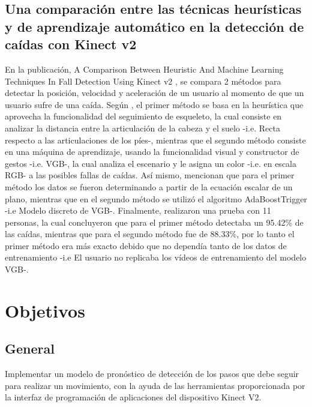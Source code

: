 \documentclass[twoside,twocolumn]{article}
\begin{document}
\subsection{Una comparaci\'on entre las t\'ecnicas heur\'isticas y de aprendizaje autom\'atico en la detecci\'on de ca\'idas con Kinect v2} \label{tr:7}
En la publicaci\'on, A Comparison Between Heuristic And Machine Learning Techniques In Fall Detection Using Kinect v2 \cite{amini2016comparison}, se compara 2 m\'etodos para detectar la posici\'on, velocidad y aceleraci\'on de un usuario al momento de que un usuario sufre de una ca\'ida.
\medbreak 
Seg\'un , el primer m\'etodo se basa en la heur\'istica que aprovecha la funcionalidad del seguimiento de esqueleto, la cual consiste en analizar la distancia entre la articulaci\'on de la cabeza y el suelo -i.e. Recta respecto a las articulaciones de los p\'ies-, mientras que el segundo m\'etodo consiste en una m\'aquina de aprendizaje, usando la funcionalidad visual y constructor de gestos -i.e. VGB-, la cual analiza el escenario y le asigna un color -i.e. en escala RGB- a las posibles fallas de ca\'idas.
\medbreak 
As\'i mismo,  mencionan que para el primer m\'etodo los datos se fueron determinando a partir de la ecuaci\'on escalar de un plano, mientras que en el segundo m\'etodo se utiliz\'o el algoritmo AdaBoostTrigger -i.e Modelo discreto de VGB-.
\medbreak 
Finalmente,  realizaron una prueba con 11 personas, la cual concluyeron que para el primer m\'etodo detectaba un 95.42\% de las ca\'idas, mientras que para el segundo m\'etodo fue de 88.33\%, por lo tanto el primer m\'etodo era m\'as exacto debido que no depend\'ia tanto de los datos de entrenamiento -i.e El usuario no replicaba los v\'ideos de entrenamiento del modelo VGB-.
\section{Objetivos}
\subsection{General}
Implementar un modelo de pronóstico de detección de los pasos que debe seguir para realizar un movimiento, con la ayuda de las herramientas proporcionada por la interfaz de programación de aplicaciones del dispositivo Kinect V2.
\end{document}
